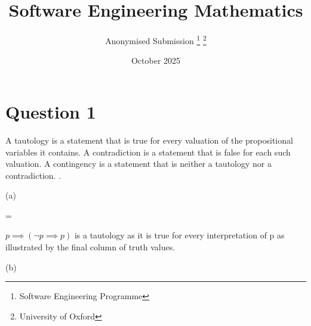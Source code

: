 \documentclass[a4paper,10pt,fleqn]{article}
\title{Software Engineering Mathematics}
\author{Anonymised Submission \thanks{Software Engineering Programme} \thanks{University of Oxford}}
\date{October 2025}
\begin{document}
\maketitle

\newpage

\setcounter{tocdepth}{1}
\tableofcontents

\newpage

\section*{Question 1}

\noindent A tautology is a statement that is true for every valuation of the propositional variables it contains. A contradiction is a statement that is false for each such valuation. A contingency is a statement that is neither a tautology nor a contradiction. \citep[Page 13]{simpson-notes}.

\bigskip

\noindent\hspace*{\parindent}(a)

\setlength{\leftskip}{\dimexpr\parindent+2em\relax}
\savedleftskip=\leftskip
\noindent
{}
\bigskip


\bigskip

\setlength{\leftskip}{\dimexpr\parindent+2em\relax}
\noindent $p \implies (\lnot p \implies p)$ is a tautology as it is true for every interpretation of p as illustrated by the final column of truth values.

\bigskip

\setlength{\leftskip}{0pt}
\medskip

\noindent\hspace*{\parindent}(b)
\end{document}
